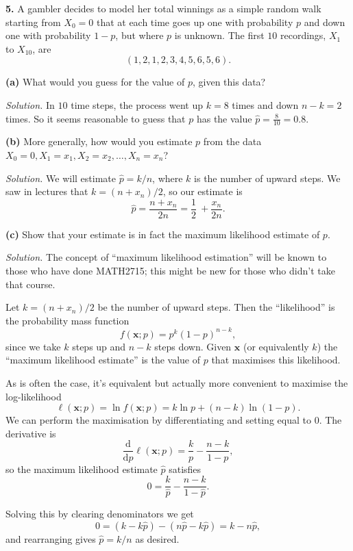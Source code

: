 \documentclass[
  a4paper,
]{article}
\theoremstyle{definition}
\theoremstyle{definition}
\theoremstyle{definition}
\theoremstyle{remark}
\begin{document}
\textbf{5.} A gambler decides to model her total winnings as a simple random walk starting from \(X_0 = 0\) that at each time goes up one with probability \(p\) and down one with probability \(1-p\), but where \(p\) is unknown. The first \(10\) recordings, \(X_1\) to \(X_{10}\), are
\[ (1, 2, 1, 2, 3, 4, 5, 6, 5, 6) . \]

\textbf{(a)} What would you guess for the value of \(p\), given this data?

\begin{myanswers}
\emph{Solution.} In \(10\) time steps, the process went up \(k = 8\) times and down \(n - k = 2\) times. So it seems reasonable to guess that \(p\) has the value \(\hat p = \frac{8}{10} = 0.8\).

\end{myanswers}

\textbf{(b)} More generally, how would you estimate \(p\) from the data \(X_0 = 0, X_1 = x_1, X_2 = x_2, \dots, X_n = x_n\)?

\begin{myanswers}
\emph{Solution.} We will estimate \(\hat p = k/n\), where \(k\) is the number of upward steps. We saw in lectures that \(k = (n + x_n)/2\), so our estimate is
\[ \hat p = \frac{n + x_n}{2n} = \frac12\ + \frac{x_n}{2n} . \]

\end{myanswers}

\textbf{(c)} Show that your estimate is in fact the maximum likelihood estimate of \(p\).

\begin{myanswers}
\emph{Solution.} The concept of ``maximum likelihood estimation'' will be known to those who have done MATH2715; this might be new for those who didn't take that course.

Let \(k = (n + x_n)/2\) be the number of upward steps. Then the ``likelihood'' is the probability mass function
\[ f(\mathbf x; p) = p^{k}(1-p)^{n-k} , \]
since we take \(k\) steps up and \(n-k\) steps down.
Given \(\mathbf x\) (or equivalently \(k\)) the ``maximum likelihood estimate'' is the value of \(p\) that maximises this likelihood.

As is often the case, it's equivalent but actually more convenient to maximise the log-likelihood
\[ \ell(\mathbf x; p) = \ln f(\mathbf x; p) = k \ln p + (n-k)\ln(1-p) .\]
We can perform the maximisation by differentiating and setting equal to \(0\). The derivative is
\[ \frac{\text{d}}{\text{d}p} \ell(\mathbf x; p) = \frac kp - \frac{n-k}{1-p} ,\]
so the maximum likelihood estimate \(\hat p\) satisfies
\[ 0 = \frac k{\hat p} - \frac{n-k}{1-\hat p} . \]

Solving this by clearing denominators we get
\[ 0 = (k - k\hat p) - (n\hat p - k\hat p) = k - n \hat p , \]
and rearranging gives \(\hat p = k/n\) as desired.

\end{myanswers}
\end{document}
